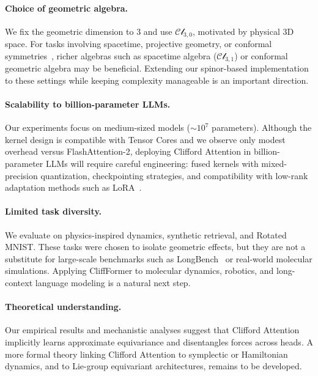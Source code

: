 \documentclass{article}
\theoremstyle{plain}
\theoremstyle{definition}
\theoremstyle{remark}
\newcommand{\cliff}{\mathcal{Cl}}
\begin{document}
\paragraph{Choice of geometric algebra.}
We fix the geometric dimension to $3$ and use $\cliff_{3,0}$, motivated by physical 3D space. For tasks involving spacetime, projective geometry, or conformal symmetries~\cite{dehaan2024choosing}, richer algebras such as spacetime algebra ($\cliff_{3,1}$) or conformal geometric algebra may be beneficial. Extending our spinor-based implementation to these settings while keeping complexity manageable is an important direction.

\paragraph{Scalability to billion-parameter LLMs.}
Our experiments focus on medium-sized models ($\sim 10^7$ parameters). Although the kernel design is compatible with Tensor Cores and we observe only modest overhead versus FlashAttention-2, deploying Clifford Attention in billion-parameter LLMs will require careful engineering: fused kernels with mixed-precision quantization, checkpointing strategies, and compatibility with low-rank adaptation methods such as LoRA~\cite{hu2021lora}.

\paragraph{Limited task diversity.}
We evaluate on physics-inspired dynamics, synthetic retrieval, and Rotated MNIST. These tasks were chosen to isolate geometric effects, but they are not a substitute for large-scale benchmarks such as LongBench~\cite{bai2023longbench} or real-world molecular simulations. Applying CliffFormer to molecular dynamics, robotics, and long-context language modeling is a natural next step.

\paragraph{Theoretical understanding.}
Our empirical results and mechanistic analyses suggest that Clifford Attention implicitly learns approximate equivariance and disentangles forces across heads. A more formal theory linking Clifford Attention to symplectic or Hamiltonian dynamics, and to Lie-group equivariant architectures, remains to be developed.

\end{document}
